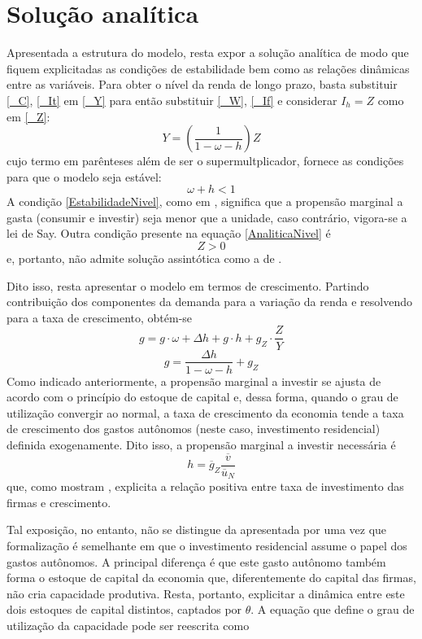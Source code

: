 \section{Solução analítica}

Apresentada a estrutura do modelo, resta expor a solução analítica de modo que fiquem explicitadas as condições de estabilidade bem como as relações dinâmicas entre as variáveis. Para obter o nível da renda de longo prazo, basta substituir \ref{_C}, \ref{_It} em \ref{_Y} para então substituir \ref{_W}, \ref{_If} e considerar $I_h = Z$ como em \ref{_Z}:
\begin{equation}
    \label{AnaliticaNivel}
    Y = \left(\frac{1}{1-\omega - h}\right)Z
\end{equation}
cujo termo em parênteses além de ser o supermultplicador, fornece as condições para que o modelo seja estável:
\begin{equation}
    \label{EstabilidadeNivel}
     \omega + h < 1
\end{equation}
A condição \ref{EstabilidadeNivel}, como em \textcite{freitas_growth_2015}, significa que a propensão marginal a gasta (consumir e investir) seja menor que a unidade, caso contrário, vigora-se a lei de Say. Outra condição presente na equação \ref{AnaliticaNivel} é
$$
Z > 0
$$
e, portanto, não admite solução assintótica como a de \textcite{allain_macroeconomic_2014}.

Dito isso, resta apresentar o modelo em termos de crescimento. Partindo contribuição dos componentes da demanda para a variação da renda e resolvendo para a taxa de crescimento, obtém-se
$$
g = g\cdot \omega + \Delta h + g\cdot h + g_Z\cdot \frac{Z}{Y}
$$
\begin{equation}
    g = \frac{\Delta h}{1 - \omega - h} + g_Z
\end{equation}
Como indicado anteriormente, a propensão marginal a investir se ajusta de acordo com o princípio do estoque de capital e, dessa forma, quando o grau de utilização convergir ao normal, a taxa de crescimento da economia tende a taxa de crescimento dos gastos autônomos (neste caso, investimento residencial) definida exogenamente. Dito isso, a propensão marginal a investir necessária é
$$
h = \overline g_Z\frac{\overline v}{\overline u_N}
$$
que, como mostram \textcite{fagundes_role_2017}, explicita a relação positiva entre taxa de investimento das firmas e crescimento. 


Tal exposição, no entanto, não se distingue da apresentada por \textcite{freitas_growth_2015} uma vez que formalização é semelhante em que o investimento residencial assume o papel dos gastos autônomos. A principal diferença é que este gasto autônomo também forma o estoque de capital da economia que, diferentemente do capital das firmas, não cria capacidade produtiva. Resta, portanto, explicitar a dinâmica entre este dois estoques de capital distintos, captados por $\theta$. A equação que define o grau de utilização da capacidade pode ser reescrita como

